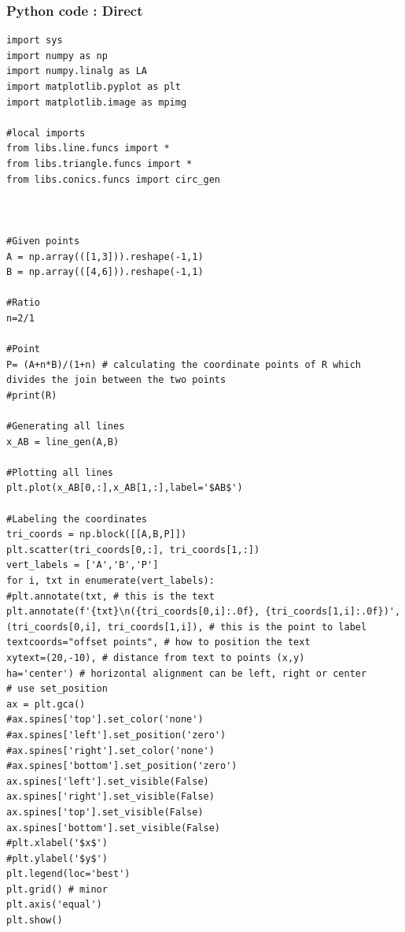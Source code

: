\documentclass{beamer}
\begin{document}
	\begin{frame}[fragile]
	\frametitle{Python code : Direct }
	
	\begin{lstlisting}
import sys                                                 
import numpy as np
import numpy.linalg as LA
import matplotlib.pyplot as plt
import matplotlib.image as mpimg

#local imports
from libs.line.funcs import *
from libs.triangle.funcs import *
from libs.conics.funcs import circ_gen



#Given points
A = np.array(([1,3])).reshape(-1,1)
B = np.array(([4,6])).reshape(-1,1)

#Ratio
n=2/1

#Point
P= (A+n*B)/(1+n) # calculating the coordinate points of R which divides the join between the two points
#print(R)

#Generating all lines
x_AB = line_gen(A,B)

#Plotting all lines
plt.plot(x_AB[0,:],x_AB[1,:],label='$AB$')

#Labeling the coordinates
tri_coords = np.block([[A,B,P]])
plt.scatter(tri_coords[0,:], tri_coords[1,:])
vert_labels = ['A','B','P']
for i, txt in enumerate(vert_labels):
#plt.annotate(txt, # this is the text
plt.annotate(f'{txt}\n({tri_coords[0,i]:.0f}, {tri_coords[1,i]:.0f})',
(tri_coords[0,i], tri_coords[1,i]), # this is the point to label
textcoords="offset points", # how to position the text
xytext=(20,-10), # distance from text to points (x,y)
ha='center') # horizontal alignment can be left, right or center
# use set_position
ax = plt.gca()
#ax.spines['top'].set_color('none')
#ax.spines['left'].set_position('zero')
#ax.spines['right'].set_color('none')
#ax.spines['bottom'].set_position('zero')
ax.spines['left'].set_visible(False)
ax.spines['right'].set_visible(False)
ax.spines['top'].set_visible(False)
ax.spines['bottom'].set_visible(False)
#plt.xlabel('$x$')
#plt.ylabel('$y$')
plt.legend(loc='best')
plt.grid() # minor
plt.axis('equal')
plt.show()
	\end{lstlisting}
\end{frame}
\end{document}
